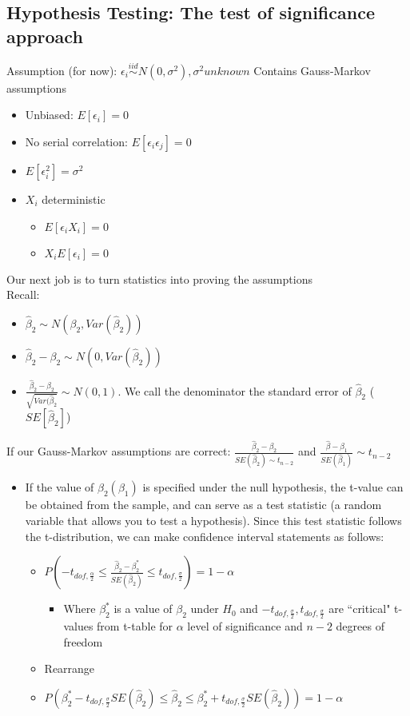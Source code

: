 \documentclass[10pt, oneside]{article}
\begin{document}
\subsection{Hypothesis Testing: The test of significance approach}
Assumption (for now): $\epsilon_i \overset{iid}{\sim} N(0, \sigma^2), \sigma^2 unknown$
Contains Gauss-Markov assumptions
\begin{itemize}
    \item Unbiased: $E[\epsilon_i] = 0$
    \item No serial correlation: $E[\epsilon_i\epsilon_j] = 0$
    \item $E[\epsilon_i ^2] = \sigma^2$
    \item $X_i$ deterministic
    \begin{itemize}
        \item $E[\epsilon_i X_i ] = 0$
        \item $X_i E[\epsilon_i] = 0$
    \end{itemize}
\end{itemize}
Our next job is to turn statistics into proving the assumptions\\
Recall:
\begin{itemize}
    \item $\hat \beta_2 \sim N(\beta_2, Var(\hat \beta_2))$
    \item $\hat \beta_2 - \beta_2 \sim N(0, Var(\hat \beta_2))$
    \item $\frac{\hat \beta_2 - \beta_2}{\sqrt{Var(\hat \beta_2}} \sim N(0,1)$. We call the denominator the standard error of $\hat \beta_2$ ($SE[\hat \beta_2]$)
\end{itemize}
If our Gauss-Markov assumptions are correct: $\frac{\hat \beta_2 - \beta_2}{SE(\hat \beta_2) \sim t_{n-2}}$ and $\frac{\hat \beta - \beta_1}{SE(\hat \beta_1)} \sim t_{n-2}$
\begin{itemize}
    \item If the value of $\beta_2 (\beta_1)$ is specified under the null hypothesis, the t-value can be obtained from the sample, and can serve as a test statistic (a random variable that allows you to test a hypothesis). Since this test statistic follows the t-distribution, we can make confidence interval statements as follows:
    \begin{itemize}
        \item $P\left(-t_{dof, \frac{\alpha}{2}} \leq \frac{\hat \beta_2 - \beta^*_2}{SE(\hat \beta_2)}\leq t_{dof, \frac{\sigma}{2}}\right) = 1- \alpha$
        \begin{itemize}
            \item Where $\beta_2^*$ is a value of $\beta_2$ under $H_0$ and $-t_{dof, \frac{\sigma}{2}}, t_{dof, \frac{\sigma}{2}}$ are ``critical" t-values from t-table for $\alpha$ level of significance and $n-2$ degrees of freedom
        \end{itemize}
        \item Rearrange
        \item $P\left(\beta^*_2 - t_{dof, \frac{\sigma}{2}} SE(\hat \beta_2 ) \leq \hat \beta_2 \leq \beta_2 ^* + t_{dof, \frac{\sigma}{2}} SE(\hat \beta_2)\right) = 1-\alpha$
    \end{itemize}
\end{itemize}
\end{document}
